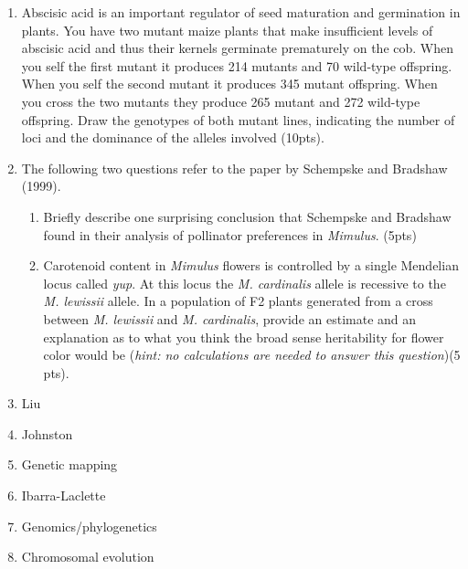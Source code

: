 \documentclass[]{article}
\begin{document}
\begin{enumerate}
\item Abscisic acid is an important regulator of seed maturation and germination in plants. You have two mutant maize plants that make insufficient levels of abscisic acid and thus their kernels germinate prematurely on the cob. When you self the first mutant it produces 214 mutants and 70 wild-type offspring.  When you self the second mutant it produces 345 mutant offspring. When you cross the two mutants they produce 265 mutant and 272 wild-type offspring. Draw the genotypes of both mutant lines, indicating the number of loci and the dominance of the alleles involved (10pts).

\item The following two questions refer to the paper by Schempske and Bradshaw (1999). 
\begin{enumerate}
\item Briefly describe one surprising conclusion that Schempske and Bradshaw found in their analysis of pollinator preferences in \emph{Mimulus}. (5pts)
\item Carotenoid content in \emph{Mimulus} flowers is controlled by a single Mendelian locus called \emph{yup}. At this locus the \emph{M. cardinalis} allele is recessive to the \emph{M. lewissii} allele. In a population of F2 plants generated from a cross between \emph{M. lewissii}  and \emph{M. cardinalis}, provide an estimate and an explanation as to what you think the broad sense heritability for flower color would be (\emph{hint: no calculations are needed to answer this question})(5 pts).
\end{enumerate}


\item Liu



\item Johnston

\item Genetic mapping

\item Ibarra-Laclette 

\item Genomics/phylogenetics

\item Chromosomal evolution

\end{enumerate}
\end{document}
